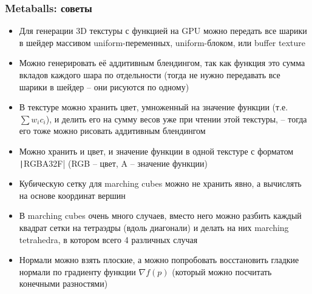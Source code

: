 \documentclass{beamer}
\begin{document}
\begin{frame}[fragile]
\frametitle{Metaballs: советы}
\fontsize{8pt}{8pt}
\selectfont
\begin{itemize}
\item Для генерации 3D текстуры с функцией на GPU можно передать все шарики в шейдер массивом uniform-переменных, uniform-блоком, или buffer texture
\item Можно генерировать её аддитивным блендингом, так как функция это сумма вкладов каждого шара по отдельности (тогда не нужно передавать все шарики в шейдер -- они рисуются по одному)
\item В текстуре можно хранить цвет, умноженный на значение функции (т.е. \begin{math}\sum w_i c_i\end{math}), и делить его на сумму весов уже при чтении этой текстуры, -- тогда его тоже можно рисовать аддитивным блендингом
\item Можно хранить и цвет, и значение функции в одной текстуре с форматом \texttt|RGBA32F| (RGB -- цвет, A -- значение функции)
\item Кубическую сетку для marching cubes можно не хранить явно, а вычислять на основе координат вершин
\item В marching cubes очень много случаев, вместо него можно разбить каждый квадрат сетки на тетраэдры (вдоль диагонали) и делать на них marching tetrahedra, в котором всего 4 различных случая
\item Нормали можно взять плоские, а можно попробовать восстановить гладкие нормали по градиенту функции \begin{math}\nabla f(p)\end{math} (который можно посчитать конечными разностями)
\end{itemize}
\end{frame}
\end{document}
